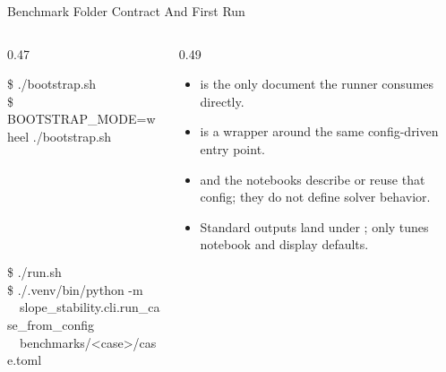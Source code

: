 \documentclass[aspectratio=169,10pt]{beamer}
\begin{document}
\begin{frame}{Benchmark Folder Contract And First Run}
\small
\begin{columns}[T,totalwidth=\textwidth]
\begin{column}{0.47\textwidth}
\begin{pseudobox}
\$ ./bootstrap.sh\\
\$ BOOTSTRAP\_MODE=wheel ./bootstrap.sh
\end{pseudobox}
\begin{pseudobox}
\\
\\
\\
\\
\\
\\[0.10cm]
\$ ./run.sh\\
\$ ./.venv/bin/python -m\\
\ \ slope\_stability.cli.run\_case\_from\_config\\
\ \ benchmarks/<case>/case.toml
\end{pseudobox}
\end{column}
\begin{column}{0.49\textwidth}
\begin{softbox}
\begin{itemize}
  \item {} is the only document the runner consumes directly.
  \item {} is a wrapper around the same config-driven entry point.
  \item {} and the notebooks describe or reuse that config; they do not define solver behavior.
  \item Standard outputs land under ; \code{[notebook]} only tunes notebook and display defaults.
\end{itemize}
\end{softbox}
\end{column}
\end{columns}
\end{frame}
\end{document}
